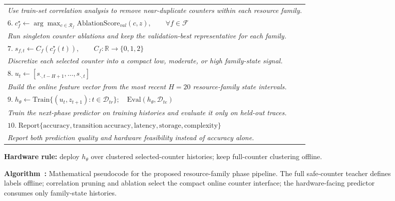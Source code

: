 \documentclass[10pt,twocolumn]{article}
\newcounter{algorithm}
\renewcommand{\thealgorithm}{\arabic{algorithm}}
\begin{document}
\begin{figure}[!t]
{\begin{minipage}{0.94\textwidth}
\begin{tabular}{@{}p{}@{}}
  \hspace{1.2em}\emph{Use train-set correlation analysis to remove near-duplicate counters within each resource family.}\\[0.25em]
  $6.\;c_f^\star \leftarrow \arg\max_{c\in \mathcal{R}_f}\mathrm{AblationScore}_{val}(c,z), \qquad \forall f\in\mathcal{F}$\\[-0.15em]
  \hspace{1.2em}\emph{Run singleton counter ablations and keep the validation-best representative for each family.}\\[0.25em]
  $7.\;s_{f,t} \leftarrow C_f(c_f^\star(t)), \qquad C_f:\mathbb{R}\rightarrow\{0,1,2\}$\\[-0.15em]
  \hspace{1.2em}\emph{Discretize each selected counter into a compact low, moderate, or high family-state signal.}\\[0.3em]
  $8.\;u_t \leftarrow [s_{\cdot,t-H+1},\ldots,s_{\cdot,t}]$\\[-0.15em]
  \hspace{1.2em}\emph{Build the online feature vector from the most recent $H=20$ resource-family state intervals.}\\[0.3em]
  $9.\;h_\theta \leftarrow \mathrm{Train}\{(u_t,z_{t+1}):t\in\mathcal{D}_{tr}\};\quad \mathrm{Eval}(h_\theta,\mathcal{D}_{te})$\\[-0.15em]
  \hspace{1.2em}\emph{Train the next-phase predictor on training histories and evaluate it only on held-out traces.}\\[0.3em]
  $10.\;\mathrm{Report}\{\mathrm{accuracy},\mathrm{transition\ accuracy},\mathrm{latency},\mathrm{storage},\mathrm{complexity}\}$\\[-0.15em]
  \hspace{1.2em}\emph{Report both prediction quality and hardware feasibility instead of accuracy alone.}\\[0.45em]
  \end{tabular}
  \endgroup

  \vspace{0.15em}
  \textbf{Hardware rule:} deploy $h_\theta$ over clustered selected-counter histories; keep full-counter clustering offline.
  \end{minipage}%
  }
  \vspace{0.35em}

  \parbox{0.94\textwidth}{\small\textbf{Algorithm~\thealgorithm:}
  Mathematical pseudocode for the proposed resource-family phase pipeline.
  The full safe-counter teacher defines labels offline; correlation pruning and ablation select the compact online counter interface; the hardware-facing predictor consumes only family-state histories.}
\end{figure}
\end{document}
